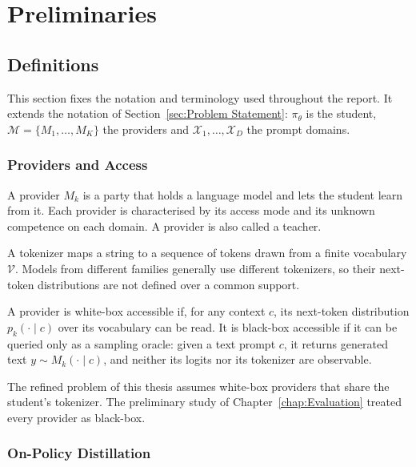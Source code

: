 \chapter{Preliminaries}
\label{chap:Preliminaries}

\section{Definitions}
\label{sec:Definitions}

This section fixes the notation and terminology used throughout the report. It
extends the notation of Section~\ref{sec:Problem Statement}: $\pi_\theta$ is the
student, $\mathcal{M} = \{M_1, \dots, M_K\}$ the providers and
$\mathcal{X}_1, \dots, \mathcal{X}_D$ the prompt domains.

\subsection{Providers and Access}

\begin{Definitions}[Provider]
A provider $M_k$ is a party that holds a language model and lets the student learn
from it. Each provider is characterised by its access mode and its unknown competence
on each domain. A provider is also called a teacher.
\end{Definitions}

A tokenizer maps a string to a sequence of tokens drawn from a finite vocabulary
$\mathcal{V}$. Models from different families generally use different tokenizers, so
their next-token distributions are not defined over a common support.

\begin{Definitions}
A provider is white-box accessible if, for any context $c$, its next-token
distribution $p_k(\cdot \mid c)$ over its vocabulary can be read. It is black-box
accessible if it can be queried only as a sampling oracle: given a text prompt $c$, it
returns generated text $y \sim M_k(\cdot \mid c)$, and neither its logits nor its
tokenizer are observable.
\end{Definitions}

The refined problem of this thesis assumes white-box providers that share the student's
tokenizer. The preliminary study of Chapter~\ref{chap:Evaluation} treated every
provider as black-box.

\subsection{On-Policy Distillation}

